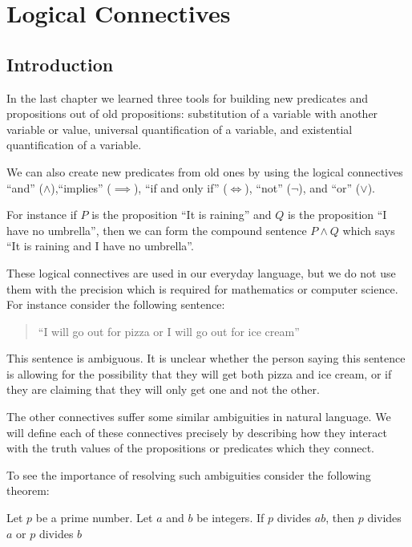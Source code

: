 \chapter{Logical Connectives}

\section{Introduction}

In the last chapter we learned three tools for building new predicates and propositions out of old propositions:  substitution of a variable with another variable or value, universal quantification of a variable, and existential quantification of a variable.

We can also create new predicates from old ones by using the logical connectives ``and'' ($\wedge$),``implies'' ($\implies$), ``if and only if'' ($\iff$), ``not'' ($\neg$), and ``or'' ($\vee$).

For instance if $P$ is the proposition ``It is raining'' and $Q$ is the proposition ``I have no umbrella'', then we can form the compound sentence $P \wedge Q$ which says ``It is raining and I have no umbrella''.

These logical connectives are used in our everyday language, but we do not use them with the precision which is required for mathematics or computer science.  For instance consider the following sentence:

\begin{quote}
		``I will go out for pizza or I will go out for ice cream''
\end{quote}

This sentence is ambiguous.  It is unclear whether the person saying this sentence is allowing for the possibility that they will get both pizza and ice cream, or if they are claiming that they will only get one and not the other.

The other connectives suffer some similar ambiguities in natural language.  We will define each of these connectives precisely by describing how they interact with the truth values of the propositions or predicates which they connect.

To see the importance of resolving such ambiguities consider the following theorem:

\begin{theorem}
		Let $p$ be a prime number.  Let $a$ and $b$ be integers. If $p$ divides $ab$, then $p$ divides $a$ or $p$ divides $b$
\end{theorem}

